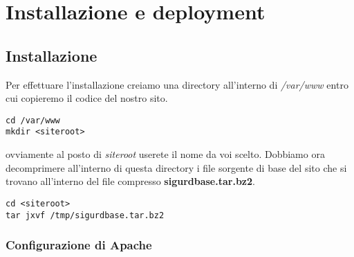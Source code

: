 \chapter[Installazione]{Installazione e deployment}

\section{Installazione}
Per effettuare l'installazione creiamo una directory all'interno di \textsl{/var/www} entro cui copieremo il codice del nostro sito.

\begin{verbatim}
cd /var/www
mkdir <siteroot>
\end{verbatim}

ovviamente al posto di \textsl{siteroot} userete il nome da voi scelto. Dobbiamo ora decomprimere all'interno di questa directory i file sorgente di base del sito che si trovano all'interno del file compresso \textbf{sigurdbase.tar.bz2}.

\begin{verbatim}
cd <siteroot>
tar jxvf /tmp/sigurdbase.tar.bz2
\end{verbatim}

\subsection{Configurazione di Apache}

